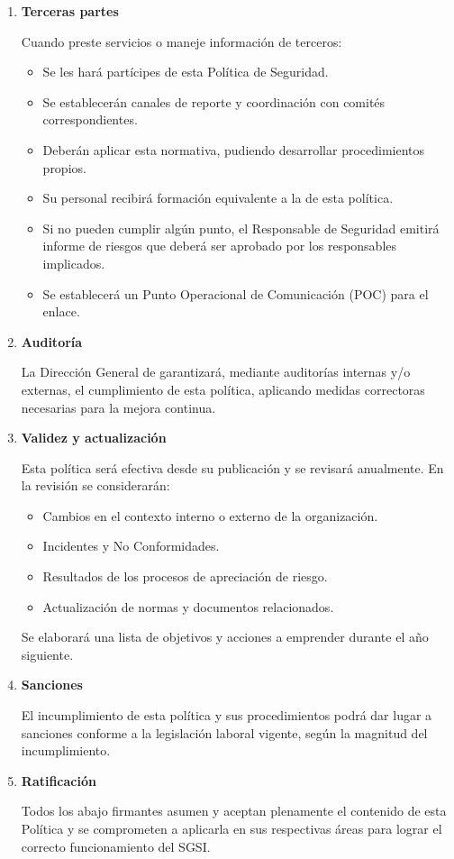 \begin{enumerate}[label=\alph*)]
\item \textbf{Terceras partes}

Cuando \Beneficiario{} preste servicios o maneje información de terceros:

\begin{itemize}
  \item Se les hará partícipes de esta Política de Seguridad.
  \item Se establecerán canales de reporte y coordinación con comités correspondientes.
  \item Deberán aplicar esta normativa, pudiendo desarrollar procedimientos propios.
  \item Su personal recibirá formación equivalente a la de esta política.
  \item Si no pueden cumplir algún punto, el Responsable de Seguridad emitirá informe de riesgos que deberá ser aprobado por los responsables implicados.
  \item Se establecerá un Punto Operacional de Comunicación (POC) para el enlace.
\end{itemize}

\item \textbf{Auditoría}

La Dirección General de \Beneficiario{} garantizará, mediante auditorías internas y/o externas, el cumplimiento de esta política, aplicando medidas correctoras necesarias para la mejora continua.

\item \textbf{Validez y actualización}

Esta política será efectiva desde su publicación y se revisará anualmente. En la revisión se considerarán:

\begin{itemize}
  \item Cambios en el contexto interno o externo de la organización.
  \item Incidentes y No Conformidades.
  \item Resultados de los procesos de apreciación de riesgo.
  \item Actualización de normas y documentos relacionados.
\end{itemize}

Se elaborará una lista de objetivos y acciones a emprender durante el año siguiente.

\item \textbf{Sanciones}

El incumplimiento de esta política y sus procedimientos podrá dar lugar a sanciones conforme a la legislación laboral vigente, según la magnitud del incumplimiento.

\item \textbf{Ratificación}

Todos los abajo firmantes asumen y aceptan plenamente el contenido de esta Política y se comprometen a aplicarla en sus respectivas áreas para lograr el correcto funcionamiento del SGSI.

\end{enumerate}